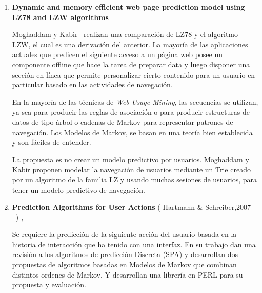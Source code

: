 \vspace{1cm}
\begin{enumerate}


  \item \textbf{Dynamic and memory efficient web page prediction model using LZ78 and LZW algorithms }

	Moghaddam y Kabir~\cite{Moghaddam2009}  realizan una comparación de LZ78  y el algoritmo LZW, el cual es una derivación del anterior. La mayoría de las aplicaciones actuales que predicen el siguiente acceso a un página web posee un  componente offline que hace la tarea de preparar data y luego disponer una sección en línea que permite personalizar cierto contenido para un usuario en particular basado en las actividades de navegación.
	
	En la mayoría de las técnicas de \emph{Web Usage Mining}, las secuencias se utilizan, ya sea para producir las reglas de asociación o para producir estructuras de datos de tipo árbol o cadenas de Markov para representar patrones de navegación. Los  Modelos de Markov, se basan en una teoría bien establecida y son fáciles de entender.  
	

	La propuesta es no crear un modelo predictivo por usuarios.
	Moghaddam y Kabir proponen modelar la navegación de usuarios mediante un Trie creado por un algoritmo de la familia LZ y usando muchas sesiones de usuarios, para tener un modelo predictivo de navegación.






  \item \textbf{Prediction Algorithms for User Actions} ( Hartmann \& Schreiber,2007  \etal~\cite{hartmann2007}) , 

	{
	Se requiere la predicción de la siguiente acción del usuario basada en la historia de interacción que ha tenido con una interfaz. 
	En su trabajo dan una revisión a los algoritmos de predicción Discreta (SPA) y desarrollan dos propuestas de algoritmos basadas en Modelos de Markov que combinan distintos ordenes de Markov. Y desarrollan una librería en PERL para su propuesta y evaluación.
	
	
	
}
\end{enumerate}
